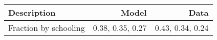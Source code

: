 \begin{tabular}{lrr}
\hline
Description & Model  & Data  \\
\hline
Fraction by schooling & 0.38, 0.35, 0.27  & 0.43, 0.34, 0.24  \\
\hline
\end{tabular}%

